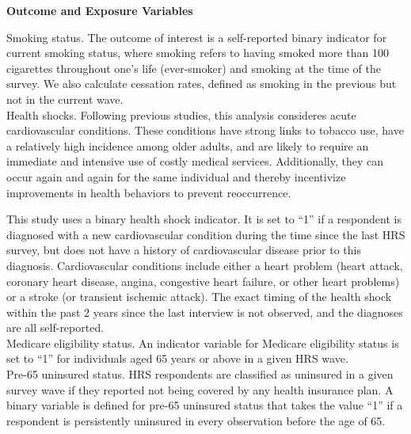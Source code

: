 \documentclass[12pt]{article}
\begin{document}
\vspace{5mm}
\noindent \textbf{\textsf{\textcolor{NavyBlue}{Outcome and Exposure Variables}}}

\noindent \textsf{Smoking status.} The outcome of interest is a self-reported binary indicator for current smoking status, where smoking refers to having smoked more than 100 cigarettes throughout one's life (ever-smoker) and smoking at the time of the survey. We also calculate cessation rates, defined as smoking in the previous but not in the current wave. \\

\noindent \textsf{Health shocks.} Following previous studies,\cite{Falba2005,Keenan2009,Khwaja2006spouse,Khwaja2006learn,Smith2001} this analysis consideres acute cardiovascular conditions. These conditions have strong links to tobacco use, have a relatively high incidence among older adults, and are likely to require an immediate and intensive use of costly medical services.\cite{Thorpe2004,Teo2006,Lloyd-Jones2010} Additionally, they can occur again and again for the same individual and thereby incentivize improvements in health behaviors to prevent reoccurrence.

This study uses a binary health shock indicator. It is set to ``1'' if a respondent is diagnosed with a new cardiovascular condition during the time since the last HRS survey, but does not have a history of cardiovascular disease prior to this diagnosis. Cardiovascular conditions include either a heart problem (heart attack, coronary heart disease, angina, congestive heart failure, or other heart problems) or a stroke (or transient ischemic attack). The exact timing of the health shock within the past 2 years since the last interview is not observed, and the diagnoses are all self-reported.\\

\noindent \textsf{Medicare eligibility status.} An indicator variable for Medicare eligibility status is set to ``1'' for individuals aged 65 years or above in a given HRS wave.\\


\noindent \textsf{Pre-65 uninsured status.} HRS respondents are classified as uninsured in a given survey wave if they reported not being covered by any health insurance plan. A binary variable is defined for pre-65 uninsured status that takes the value ``1'' if a respondent is persistently uninsured in every observation before the age of 65. \\
\end{document}
